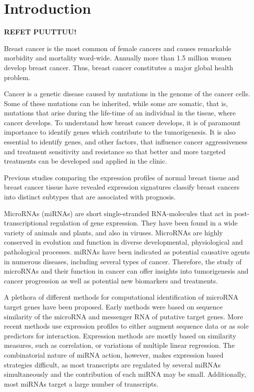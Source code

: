 
\section{Introduction}
\thispagestyle{empty}

\textbf{REFET PUUTTUU!}

Breast cancer is the most common of female cancers and causes remarkable
morbidity and mortality word-wide. Annually more than 1.5 million women
develop breast cancer. Thus, breast cancer constitutes a major global health
problem.

Cancer is a genetic disease caused by mutations in the genome of the cancer
cells. Some of these mutations can be inherited, while some are somatic, that
is, mutations that arise during the life-time of an individual in the tissue,
where cancer develops. To understand how breast cancer develops, it is of
paramount importance to identify genes which contribute to the tumorigenesis.
It is also essential to identify genes, and other factors, that influence
cancer aggressiveness and treatment sensitivity and resistance so that better and
more targeted treatments can be developed and applied in the clinic.

Previous studies comparing the expression profiles of normal breast tissue
and breast cancer tissue have revealed expression signatures
classify breast cancers into distinct subtypes that are associated with prognosis.

MicroRNAs (miRNAs) are short single-stranded RNA-molecules that act in
post-transcriptional regulation of gene expression. They have been found in a
wide variety of animals and plants, and also in viruses. MicroRNAs are highly
conserved in evolution and function in diverse developmental, physiological
and pathological processes. miRNAs have been indicated as potential
causative agents in numerous diseases, including several types of cancer.
Therefore, the study of microRNAs and their function in cancer can offer
insights into tumorigenesis and cancer progression as well as potential new
biomarkers and treatments.

A plethora of different methods for computational identification of microRNA
target genes have been proposed. Early methods were based on sequence
similarity of the microRNA and messenger RNA of putative target genes. More
recent methods use expression profiles to either augment sequence data or as
sole predictors for interaction. Expression methods are mostly based on
similarity measures, such as correlation, or variations of multiple
linear regression. The combinatorial nature of miRNA action, however, makes
expression based strategies difficult, as most transcripts are regulated by
several miRNAs simultaneously and the contribution of each miRNA may
be small. Additionally, most miRNAs target a large number of transcripts.

